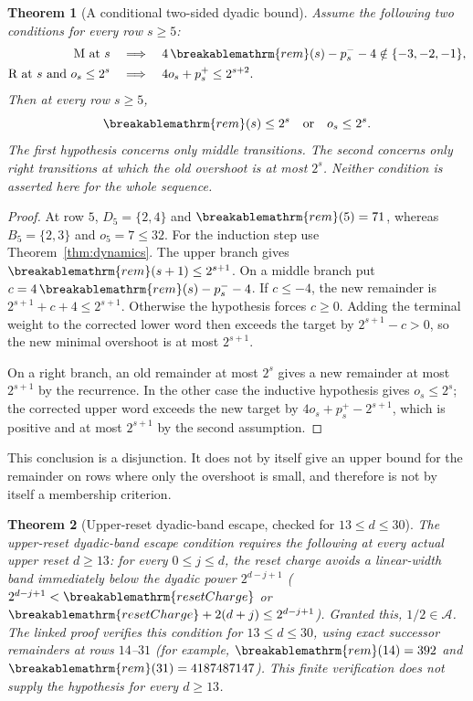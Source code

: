 \documentclass[11pt]{article}
\theoremstyle{plain}
\newtheorem{thm}{Theorem}[section]
\theoremstyle{definition}
\theoremstyle{remark}
\renewcommand{\mathrm}[1]{\ifmmode\breakablemathrm{#1}\else\textrm{#1}\fi}%
\begin{document}
\begin{thm}[A conditional two-sided dyadic bound]
\label{thm:two-sided-dyadic}
Assume the following two conditions for every row $s\ge5$:
\[
 \begin{aligned}
 \mathrm M\text{ at }s&\quad\Longrightarrow\quad
 4\,\mathrm{rem}(s)-p_s^--4\notin\{-3,-2,-1\},\\
 \mathrm R\text{ at }s\text{ and }o_s\le2^s
 &\quad\Longrightarrow\quad 4o_s+p_s^+\le2^{s+2}.
 \end{aligned}
\]
Then at every row $s\ge5$,
\[
 \mathrm{rem}(s)\le2^s\quad\text{or}\quad o_s\le2^s.
\]
The first hypothesis concerns only middle transitions.  The second
concerns only right transitions at which the old overshoot is at most
$2^s$.  Neither condition is asserted here for the whole sequence.
\end{thm}
\begin{proof}
At row $5$, $D_5=\{2,4\}$ and $\mathrm{rem}(5)=71$, whereas
$B_5=\{2,3\}$ and $o_5=7\le32$.  For the induction step use
Theorem~\ref{thm:dynamics}.  The upper branch gives
$\mathrm{rem}(s+1)\le2^{s+1}$.  On a middle branch put
$c=4\,\mathrm{rem}(s)-p_s^--4$.  If $c\le-4$, the new remainder
is $2^{s+1}+c+4\le2^{s+1}$.  Otherwise the hypothesis forces
$c\ge0$.  Adding the terminal weight to the corrected lower word
then exceeds the target by $2^{s+1}-c>0$, so the new minimal
overshoot is at most $2^{s+1}$.

On a right branch, an old remainder at most $2^s$ gives a new
remainder at most $2^{s+1}$ by the recurrence.  In the other case
the inductive hypothesis gives $o_s\le2^s$; the corrected upper
word exceeds the new target by $4o_s+p_s^+-2^{s+1}$, which is
positive and at most $2^{s+1}$ by the second assumption.
\end{proof}
This conclusion is a disjunction.  It does not by itself give an
upper bound for the remainder on rows where only the overshoot is
small, and therefore is not by itself a membership criterion.

\begin{thm}[Upper-reset dyadic-band escape, checked for $13\le d\le30$]
\label{thm:upper-reset-band}
The upper-reset dyadic-band escape condition requires the following at every
actual upper reset $d\ge13$: for every $0\le j\le d$, the
reset charge avoids a linear-width band immediately below the dyadic power
$2^{d-j+1}$ ($2^{d-j+1}<\mathrm{resetCharge}$ or
$\mathrm{resetCharge}+2(d+j)\le 2^{d-j+1}$). Granted this, $1/2\in
\ensuremath{\mathcal A}$. The linked proof verifies this condition for
$13\le d\le30$, using exact successor remainders at rows $14$--$31$
(for example, $\mathrm{rem}(14)=392$ and
$\mathrm{rem}(31)=4187487147$). This finite verification does not
supply the hypothesis for every $d\ge13$.
\end{thm}
\end{document}
